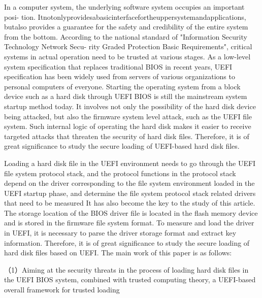 \begin{eabstract}
In a computer system, the underlying software system occupies an important posi-
tion. Itnotonlyprovidesabasicinterfacefortheuppersystemandapplications, butalso
provides a guarantee for the safety and credibility of the entire system from the bottom.
According to the national standard of "Information Security Technology Network Secu-
rity Graded Protection Basic Requirements", critical systems in actual operation need to
be trusted at various stages. As a low-level system specification that replaces traditional
BIOS in recent years, UEFI specification has been widely used from servers of various
organizations to personal computers of everyone. Starting the operating system from
a block device such as a hard disk through UEFI BIOS is still the mainstream system
startup method today. It involves not only the possibility of the hard disk device being
attacked, but also the firmware system level attack, such as the UEFI file system. Such
internal logic of operating the hard disk makes it easier to receive targeted attacks that
threaten the security of hard disk files. Therefore, it is of great significance to study the
secure loading of UEFI-based hard disk files.
\par Loading a hard disk file in the UEFI environment needs to go through the UEFI
file system protocol stack, and the protocol functions in the protocol stack depend on the
driver corresponding to the file system environment loaded in the UEFI startup phase,
and determine the file system protocol stack related drivers that need to be measured It
has also become the key to the study of this article. The storage location of the BIOS
driver file is located in the flash memory device and is stored in the firmware file system
format. To measure and load the driver in UEFI, it is necessary to parse the driver
storage format and extract key information. Therefore, it is of great significance to
study the secure loading of hard disk files based on UEFI. The main work of this paper
is as follows:
\par （1）Aiming at the security threats in the process of loading hard disk files in the UEFI BIOS 
system, combined with trusted computing theory, a UEFI-based overall framework for trusted loading 

\end{eabstract}
